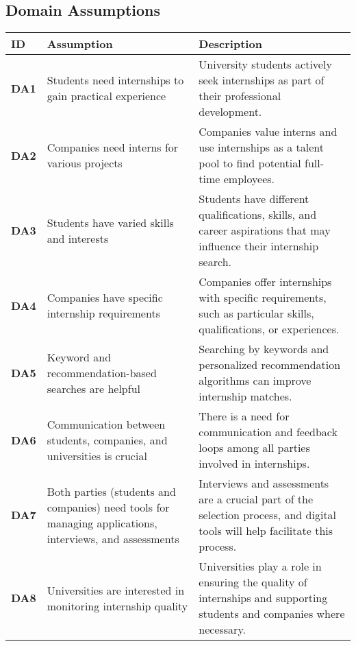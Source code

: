 \subsection{Domain Assumptions}

\begin{longtable}{|p{1cm}| p{4cm} | p{5cm} |}
\hline
\textbf{ID} & \textbf{Assumption} & \textbf{Description} \\ 
\hline
\textbf{DA1} & Students need internships to gain practical experience & 
University students actively seek internships as part of their professional development. \\ 
\hline
\textbf{DA2} & Companies need interns for various projects & 
Companies value interns and use internships as a talent pool to find potential full-time employees. \\ 
\hline
\textbf{DA3} & Students have varied skills and interests & 
Students have different qualifications, skills, and career aspirations that may influence their internship search. \\ 
\hline
\textbf{DA4} & Companies have specific internship requirements & 
Companies offer internships with specific requirements, such as particular skills, qualifications, or experiences. \\ 
\hline
\textbf{DA5} & Keyword and recommendation-based searches are helpful & 
Searching by keywords and personalized recommendation algorithms can improve internship matches. \\ 
\hline
\textbf{DA6} & Communication between students, companies, and universities is crucial & 
There is a need for communication and feedback loops among all parties involved in internships. \\ 
\hline
\textbf{DA7} & Both parties (students and companies) need tools for managing applications, interviews, and assessments & 
Interviews and assessments are a crucial part of the selection process, and digital tools will help facilitate this process. \\ 
\hline
\textbf{DA8} & Universities are interested in monitoring internship quality & 
Universities play a role in ensuring the quality of internships and supporting students and companies where necessary. \\ 
\hline
\end{longtable}

\newpage
